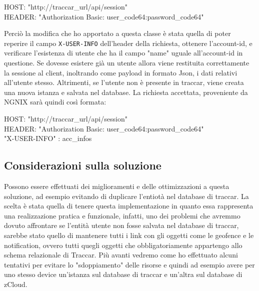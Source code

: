 \documentclass[a4paper,titlepage,12pt]{book}
\begin{document}
{\begin{center}\begin{flushleft}
HOST: "http://traccar\_url/api/session"\\
HEADER: "Authorization Basic: user\_code64:password\_code64"\par\medskip
\end{flushleft}

\end{center}

Perciò la modifica che ho apportato a questa classe è stata quella di poter reperire il campo \texttt{X-USER-INFO} dell'header della richiesta, ottenere l'account-id, e verificare l'esistenza di utente che ha il campo "name" uguale all'account-id in questione. Se dovesse esistere già un utente allora viene restituita correttamente la sessione al client, inoltrando come payload in formato Json, i dati relativi all'utente stesso. Altrimenti, se l'utente non è presente in traccar, viene creata una nuova istanza e salvata nel database. La richiesta accettata, proveniente da NGNIX sarà quindi così formata:
\par\medskip

\begin{center}\begin{flushleft}
HOST: "http://traccar\_url/api/session"\\
HEADER: "Authorization Basic: user\_code64:password\_code64"\\
\qquad \qquad \quad       "X-USER-INFO" : acc\_infos
\end{flushleft}

\end{center}
\subsection{
Considerazioni sulla soluzione}
Possono essere effettuati dei miglioramenti e delle ottimizzazioni a questa soluzione, ad esempio evitando di duplicare l'entiotà nel database di traccar. La scelta è stata quella di tenere questa implementazione in quanto essa rappresenta una realizzazione pratica e funzionale, infatti, uno dei problemi che avremmo dovuto affrontare se l'entità utente non fosse salvata nel database di traccar, sarebbe stato quello di mantenere tutti i link con gli oggetti come le geofence e le notification, ovvero tutti quegli oggetti che obbligatoriamente appartengo allo schema relazionale di Traccar. Più avanti vedremo come ho effettuato alcuni tentativi per evitare lo "sdoppiamento" delle risorse e quindi ad esempio avere per uno stesso device un'istanza sul database di traccar e un'altra sul database di zCloud.


}
\end{document}

